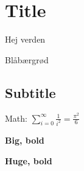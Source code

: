\documentclass[a4paper, danish]{article}
\begin{document}
\section{Title}

{\large Hej verden\par}

{\large Bl\aa b\ae rgr\o d\par}

\subsection {Subtitle}

Math: $\sum_{i=0}^\infty \frac{1}{i^2} = \frac{\pi^2}{6}$

{\large\bf Big, bold\par}

{\Huge\bf Huge, bold\par}
\end{document}
